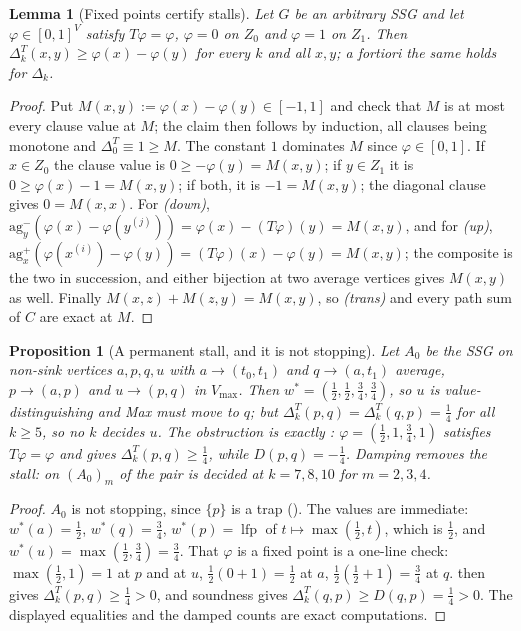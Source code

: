 \documentclass[11pt]{article}
\theoremstyle{plain}
\newtheorem{lemma}[theorem]{Lemma}
\newtheorem{proposition}[theorem]{Proposition}
\theoremstyle{definition}
\DeclareMathOperator{\lfp}{lfp}
\newcommand{\Vmax}{V_{\max}}
\begin{document}
\begin{lemma}[Fixed points certify stalls]\label{lem:phi-certificate}
Let $G$ be an arbitrary SSG and let $\varphi\in[0,1]^{V}$ satisfy
$T\varphi=\varphi$, $\varphi=0$ on $Z_0$ and $\varphi=1$ on $Z_1$. Then
$\Delta^{T}_k(x,y)\ge\varphi(x)-\varphi(y)$ for every $k$ and all $x,y$;
a fortiori the same holds for $\Delta_k$.
\end{lemma}

\begin{proof}
Put $M(x,y):=\varphi(x)-\varphi(y)\in[-1,1]$ and check that $M$ is at
most every clause value at $M$; the claim then follows by induction, all
clauses being monotone and $\Delta^{T}_0\equiv1\ge M$. The constant $1$
dominates $M$ since $\varphi\in[0,1]$. If $x\in Z_0$ the clause value is
$0\ge-\varphi(y)=M(x,y)$; if $y\in Z_1$ it is $0\ge\varphi(x)-1=M(x,y)$;
if both, it is $-1=M(x,y)$; the diagonal clause gives $0=M(x,x)$. For
\emph{(down)},
$\mathrm{ag}^{-}_{y}(\varphi(x)-\varphi(y^{(j)}))=\varphi(x)-(T\varphi)(y)=M(x,y)$,
and for \emph{(up)},
$\mathrm{ag}^{+}_{x}(\varphi(x^{(i)})-\varphi(y))=(T\varphi)(x)-\varphi(y)=M(x,y)$;
the composite is the two in succession, and either bijection at two
average vertices gives $M(x,y)$ as well. Finally
$M(x,z)+M(z,y)=M(x,y)$, so \emph{(trans)} and every path sum of $C$ are
exact at $M$.
\end{proof}

\begin{proposition}[A permanent stall, and it is not
stopping]\label{prop:trans-stall}
Let $A_0$ be the SSG on non-sink vertices $a,p,q,u$ with
$a\to(t_0,t_1)$ and $q\to(a,t_1)$ average, $p\to(a,p)$ and $u\to(p,q)$
in $\Vmax$. Then $w^\ast=(\tfrac12,\tfrac12,\tfrac34,\tfrac34)$, so $u$
is value-distinguishing and Max must move to $q$; but
$\Delta^{T}_k(p,q)=\Delta^{T}_k(q,p)=\tfrac14$ for all $k\ge5$, so no
$k$ decides $u$. The obstruction is exactly
: $\varphi=(\tfrac12,1,\tfrac34,1)$ satisfies
$T\varphi=\varphi$ and gives $\Delta^{T}_k(p,q)\ge\tfrac14$, while
$D(p,q)=-\tfrac14$. Damping removes the stall: on $(A_0)_m$ of
 the pair is decided at $k=7,8,10$ for $m=2,3,4$.
\end{proposition}

\begin{proof}
$A_0$ is not stopping, since $\{p\}$ is a trap ().
The values are immediate: $w^\ast(a)=\tfrac12$, $w^\ast(q)=\tfrac34$,
$w^\ast(p)=\lfp$ of $t\mapsto\max(\tfrac12,t)$, which is $\tfrac12$, and
$w^\ast(u)=\max(\tfrac12,\tfrac34)=\tfrac34$. That $\varphi$ is a fixed
point is a one-line check: $\max(\tfrac12,1)=1$ at $p$ and at $u$,
$\tfrac12(0+1)=\tfrac12$ at $a$, $\tfrac12(\tfrac12+1)=\tfrac34$ at $q$.
 then gives $\Delta^{T}_k(p,q)\ge\tfrac14>0$,
and soundness gives $\Delta^{T}_k(q,p)\ge D(q,p)=\tfrac14>0$. The
displayed equalities and the damped counts are exact computations.
\end{proof}
\end{document}
